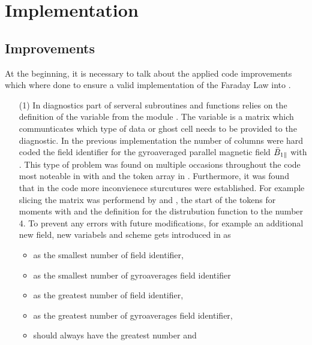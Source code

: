 \section{Implementation}
\label{sec:implementation}

\subsection{Improvements}
\label{sub:improvements}

At the beginning, it is necessary to talk about the applied code improvements which where done to ensure a valid implementation of the Faraday Law into \gkw.
\begin{enumerate}
    \item[(1)] In diagnostics part of \gkw serveral subroutines and functions relies on the definition of the variable  from the module . The variable  is a matrix which communticates which type of data or ghost cell needs to be provided to the diagnostic. In the previous implementation the number of columns were hard coded the field identifier for the gyroaveraged parallel magnetic field $\bar{B}_{1\parallel}$ with . This type of problem was found on multiple occasions throughout the code most noteable in  with  and the token array in . Furthermore, it was found that in the code more inconvienece sturcutures were established. For example slicing the  matrix was performend by  and , the start of the tokens for moments with  and the definition for the distrubution function to the number 4. To prevent any errors with future modifications, for example an additional new field, new variabels and scheme gets introduced in  as
    \begin{itemize}
        \item {} as the smallest number of field identifier, 
        \item {} as the smallest number of gyroaverages field identifier
        \item {} as the greatest number of field identifier, 
        \item {} as the greatest number of gyroaverages field identifier,
        \item {} should always have the greatest number and

\end{itemize}
\end{enumerate}
